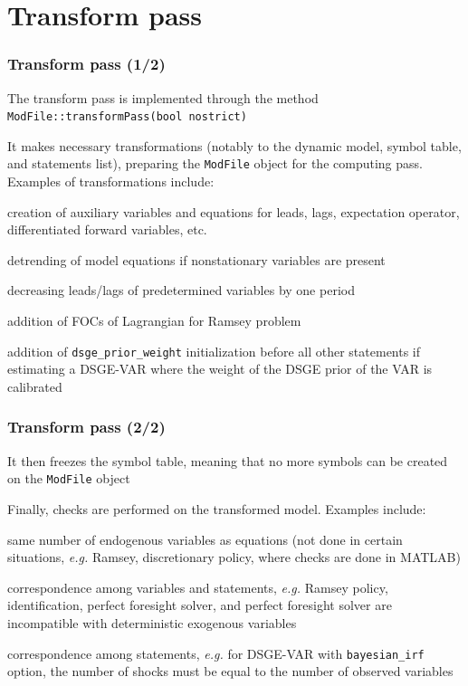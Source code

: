 \documentclass[aspectratio=169]{beamer}
\newenvironment{witemize}{\itemize\addtolength{\itemsep}{8pt}}{\enditemize}
\begin{document}
\section{Transform pass}

\begin{frame}
  \frametitle{Transform pass (1/2)}
  \begin{witemize}
  \item The transform pass is implemented through the method \texttt{ModFile::transformPass(bool nostrict)}
  \item It makes necessary transformations (notably to the dynamic model, symbol table, and statements list), preparing the \texttt{ModFile} object for the computing pass. Examples of transformations include:
    \begin{witemize}
    \item creation of auxiliary variables and equations for leads, lags, expectation operator, differentiated forward variables, etc.
    \item detrending of model equations if nonstationary variables are present
    \item decreasing leads/lags of predetermined variables by one period
    \item addition of FOCs of Lagrangian for Ramsey problem
    \item addition of \texttt{dsge\_prior\_weight} initialization before all other statements if estimating a DSGE-VAR where the weight of the DSGE prior of the VAR is calibrated
    \end{witemize}
  \end{witemize}
\end{frame}

\begin{frame}
  \frametitle{Transform pass (2/2)}
  \begin{witemize}
  \item It then freezes the symbol table, meaning that no more symbols can be created on the \texttt{ModFile} object
  \item Finally, checks are performed on the transformed model. Examples include:
    \begin{witemize}
    \item same number of endogenous variables as equations (not done in certain situations, \textit{e.g.} Ramsey, discretionary policy, where checks are done in MATLAB)
    \item correspondence among variables and statements, \textit{e.g.} Ramsey policy, identification, perfect foresight solver, and perfect foresight solver are incompatible with deterministic exogenous variables
    \item correspondence among statements, \textit{e.g.} for DSGE-VAR with \texttt{bayesian\_irf} option, the number of shocks must be equal to the number of observed variables
    \end{witemize}
  \end{witemize}
\end{frame}
\end{document}
